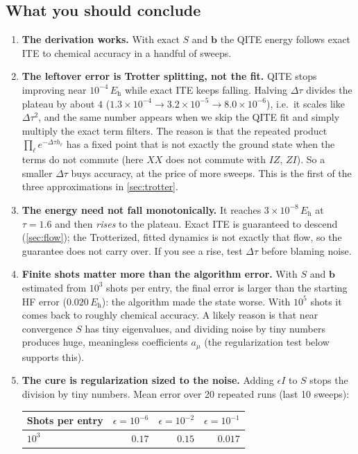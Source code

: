 \documentclass[11pt,a4paper]{article}
\newcommand{\dt}{\Delta\tau}
\newcommand{\Eh}{E_{\mathrm h}}
\begin{document}
\subsection*{What you should conclude}
\begin{enumerate}
\item \textbf{The derivation works.} With exact $S$ and $\bm b$ the QITE energy follows exact ITE to chemical accuracy in a handful of sweeps.
\item \textbf{The leftover error is Trotter splitting, not the fit.} QITE stops improving near $10^{-4}\,\Eh$ while exact ITE keeps falling. Halving $\dt$ divides the plateau by about $4$ ($1.3\times10^{-4}\to3.2\times10^{-5}\to8.0\times10^{-6}$), i.e.\ it scales like $\dt^2$, and the same number appears when we skip the QITE fit and simply multiply the exact term filters. The reason is that the repeated product $\prod_\ell e^{-\dt h_\ell}$ has a fixed point that is not exactly the ground state when the terms do not commute (here $XX$ does not commute with $IZ$, $ZI$). So a smaller $\dt$ buys accuracy, at the price of more sweeps. This is the first of the three approximations in \cref{sec:trotter}.
\item \textbf{The energy need not fall monotonically.} It reaches $3\times10^{-8}\,\Eh$ at $\tau=1.6$ and then \emph{rises} to the plateau. Exact ITE is guaranteed to descend (\cref{sec:flow}); the Trotterized, fitted dynamics is not exactly that flow, so the guarantee does not carry over. If you see a rise, test $\dt$ before blaming noise.
\item \textbf{Finite shots matter more than the algorithm error.} With $S$ and $\bm b$ estimated from $10^3$ shots per entry, the final error is larger than the starting HF error ($0.020\,\Eh$): the algorithm made the state worse. With $10^5$ shots it comes back to roughly chemical accuracy. A likely reason is that near convergence $S$ has tiny eigenvalues, and dividing noise by tiny numbers produces huge, meaningless coefficients $a_\mu$ (the regularization test below supports this).
\item \textbf{The cure is regularization sized to the noise.} Adding $\epsilon I$ to $S$ stops the division by tiny numbers. Mean error over 20 repeated runs (last 10 sweeps):
\begin{center}
\small
\begin{tabular}{@{}lrrr@{}}
\toprule
Shots per entry & $\epsilon=10^{-6}$ & $\epsilon=10^{-2}$ & $\epsilon=10^{-1}$\\\midrule
$10^{3}$ & $0.17$ & $0.15$ & $0.017$\\

\end{tabular}
\end{center}
\end{enumerate}
\end{document}
